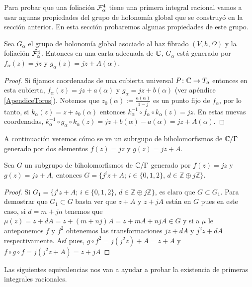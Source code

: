 Para probar que una foliación $\mathcal{F}_{\alpha}^{4}$ tiene una primera integral racional vamos a usar agunas propiedades del grupo de holonomía global que se construyó en la sección anterior. En esta sección probaremos algunas propiedades de este grupo. 

\begin{Lema}
\label{Lema:GrupoHolonomia}
Sea $G_{\alpha}$ el grupo de holonomía global asociado al haz fibrado $(V,h,\Omega)$ y la foliación $\tilde{\mathcal{F}_{\alpha}^{4}}$. Entonces en una carta adecuada de $\mathbb{C}$, $G_{\alpha}$ está generado por $f_{\alpha}(z)=jz$ y $g_{\alpha}(z)=jz+A(\alpha)$.
\end{Lema}
\begin{proof}
Si fijamos coordenadas de una cubierta universal $P\colon \mathbb{C}\rightarrow T_{a}$ entonces en esta cubierta, $f_{\alpha}(z)=jz+a(\alpha)$ y $g_{\alpha}=jz+b(\alpha)$ (ver apéndice \ref{ApendiceToros}). Notemos que $z_{0}(\alpha):=\tfrac{a(\alpha)}{1-j}$ es un punto fijo de $f_{\alpha}$, por lo tanto, si $k_{\alpha}(z)=z+z_{0}(\alpha)$ entonces $k_{\alpha}^{-1}\circ f_{\alpha}\circ k_{\alpha}(z)=jz$. En estas nuevas coordenadas, $k_{\alpha}^{-1}\circ g_{\alpha}\circ k_{\alpha}(z)=jz+b(\alpha)-a(\alpha)=jz+A(\alpha)$. 
\end{proof}

A continuación veremos cómo se ve un subrgupo de biholomorfismos de $\mathbb{C}/\Gamma$ generado por dos elementos $f(z)=jz$ y $g(z)=jz+A$.

\begin{Proposicion}
\label{Prop:DescripcionDelGrupo}
Sea $G$ un subgrupo de biholomorfismos de $\mathbb{C}/\Gamma$ generado por $f(z)=jz$ y $g(z)=jz+A$, entonces $G=\{j^{i}z+A;\, i\in\{0,1,2\},\, d\in\mathbb{Z}\oplus j\mathbb{Z} \}$.
\end{Proposicion}
\begin{proof}
Si $G_{1}=\{j^{i}z+A;\, i\in\{0,1,2\},\, d\in\mathbb{Z}\oplus j\mathbb{Z} \}$, es claro que $G\subset G_{1}$. Para demostrar que $G_{1}\subset G$ basta ver que $z+A$ y $z+jA$ están en $G$ pues en este caso, si $d=m+jn$ tenemos que $\mu(z)=z+dA=z+(m+nj)A=z+mA+njA\in G$ y si a $\mu$ le anteponemos $f$ y $f^{2}$ obtenemos las transformaciones $jz+dA$ y $j^{2}z+dA$ respectivamente. Así pues, $g\circ f^{2}=j(j^{2}z)+A=z+A$ y $f\circ g\circ f=j(j^{2}z+A)=z+jA$
\end{proof}

Las siguientes equivalencias nos van a ayudar a probar la existencia de primeras integrales racionales.

